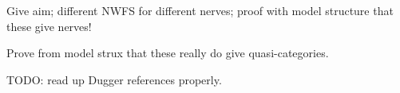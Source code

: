 \para Give aim; different NWFS for different nerves; proof with model structure that these give nerves!

\para Prove from model strux that these really do give quasi-categories. 

TODO: read up Dugger references properly.




